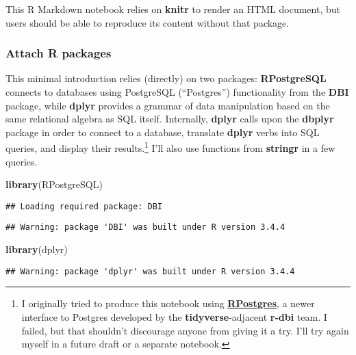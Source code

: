 \documentclass[]{article}
\newenvironment{Shaded}{\begin{snugshade}}{\end{snugshade}}
\newcommand{\KeywordTok}[1]{\textcolor[rgb]{0.13,0.29,0.53}{\textbf{#1}}}
\newcommand{\NormalTok}[1]{#1}
\let\rmarkdownfootnote\footnote%
\def\footnote{\protect\rmarkdownfootnote}
\begin{document}
This R Markdown notebook relies on \textbf{knitr} to render an HTML
document, but users should be able to reproduce its content without that
package.

\subsubsection{Attach R packages}\label{attach-r-packages}

This minimal introduction relies (directly) on two packages:
\textbf{RPostgreSQL} connects to databases using PostgreSQL
(``Postgres'') functionality from the \textbf{DBI} package, while
\textbf{dplyr} provides a grammar of data manipulation based on the same
relational algebra as SQL itself. Internally, \textbf{dplyr} calls upon
the \textbf{dbplyr} package in order to connect to a database, translate
\textbf{dplyr} verbs into SQL queries, and display their
results.\footnote{I originally tried to produce this notebook using
  \href{https://github.com/r-dbi/RPostgres}{\textbf{RPostgres}}, a newer
  interface to Postgres developed by the \textbf{tidyverse}-adjacent
  \textbf{r-dbi} team. I failed, but that shouldn't discourage anyone
  from giving it a try. I'll try again myself in a future draft or a
  separate notebook.} I'll also use functions from \textbf{stringr} in a
few queries.

\begin{Shaded}
\begin{Highlighting}[]
\KeywordTok{library}\NormalTok{(RPostgreSQL)}
\end{Highlighting}
\end{Shaded}

\begin{verbatim}
## Loading required package: DBI
\end{verbatim}

\begin{verbatim}
## Warning: package 'DBI' was built under R version 3.4.4
\end{verbatim}

\begin{Shaded}
\begin{Highlighting}[]
\KeywordTok{library}\NormalTok{(dplyr)}
\end{Highlighting}
\end{Shaded}

\begin{verbatim}
## Warning: package 'dplyr' was built under R version 3.4.4
\end{verbatim}
\end{document}
